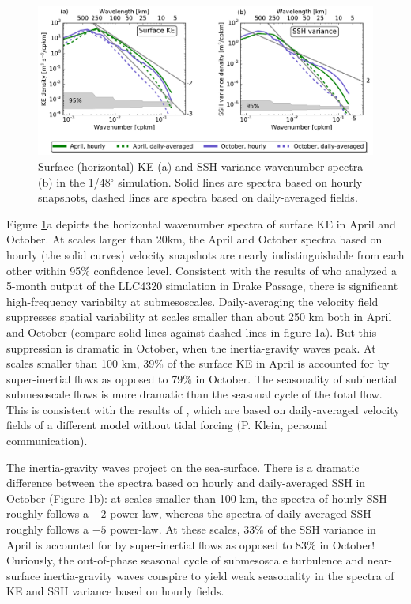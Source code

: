 \documentclass[grl]{agutex2015}
\begin{document}
\begin{article}
\begin{figure}[ht]
  \begin{center}
    \includegraphics[width=1.\textwidth]{figs/fig4.pdf}
 \caption{Surface (horizontal) KE (a) and SSH variance wavenumber spectra (b)
 in the 1/48$^\circ$ simulation. Solid lines
 are spectra based on hourly snapshots, dashed lines are spectra based on daily-averaged
 fields.}
 \label{fig4}
 \end{center}
\end{figure}


Figure \ref{fig4}a depicts the horizontal wavenumber spectra of surface KE in
April and October. At scales larger than 20km, the April and October spectra based on hourly (the solid curves)
velocity snapshots are nearly indistinguishable from each other within 95$\%$ confidence level.
Consistent with the results of
\citet{rocha_etal2016} who analyzed a 5-month output of the LLC4320 simulation in Drake Passage,
there is significant high-frequency variabilty at submesoscales. Daily-averaging
the velocity field suppresses spatial variability at scales smaller than about 250
km both in April and October (compare solid lines against dashed lines in figure
\ref{fig4}a). But this suppression is dramatic in October, when the inertia-gravity waves peak. At scales
smaller than 100 km, 39$\%$ of the surface KE in April is accounted for by super-inertial
flows as opposed to 79$\%$ in October. The seasonality of subinertial submesoscale flows
is more dramatic than the seasonal cycle of the total flow. This is consistent
with the results of \citet{sasaki_etal2014}, which are
based on daily-averaged velocity fields of a different model without tidal forcing
(P. Klein, personal communication).

The inertia-gravity waves project on the sea-surface.
There is a dramatic difference between the spectra
based on hourly and daily-averaged SSH in October (Figure \ref{fig4}b): at scales smaller than 100 km, the spectra
of hourly SSH roughly follows a $-2$ power-law, whereas the spectra of daily-averaged
SSH roughly follows a $-5$ power-law. At these scales, 33$\%$ of the SSH variance in April is accounted for by super-inertial
flows as opposed to 83$\%$ in October! Curiously, the out-of-phase seasonal cycle of submesoscale
turbulence and near-surface inertia-gravity waves conspire to yield weak seasonality
in the spectra of KE and SSH variance based on hourly fields.



\end{article}
\end{document}
